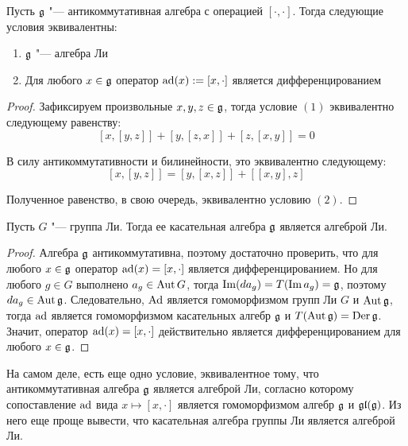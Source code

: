 \begin{theorem}
	Пусть $\mathfrak g$ "--- антикоммутативная алгебра с операцией $[\cdot, \cdot]$. Тогда следующие условия эквивалентны:
	\begin{enumerate}
		\item $\mathfrak g$ "--- алгебра Ли
		\item Для любого $x \in \mathfrak g$ оператор $\operatorname{ad} (x) := [x, \cdot]$ является дифференцированием
	\end{enumerate}
\end{theorem}

\begin{proof}
	Зафиксируем произвольные $x, y, z \in \mathfrak g$, тогда условие $(1)$ эквивалентно следующему равенству:
	\[[x, [y, z]] + [y, [z, x]] + [z, [x, y]] = 0\]
	
	В силу антикоммутативности и билинейности, это эквивалентно следующему:
	\[[x, [y, z]] = [y, [x, z]] + [[x, y], z]\]
	
	Полученное равенство, в свою очередь, эквивалентно условию $(2)$.
\end{proof}

\begin{corollary}
	Пусть $G$ "--- группа Ли. Тогда ее касательная алгебра $\mathfrak g$ является алгеброй Ли.
\end{corollary}

\begin{proof}
	Алгебра $\mathfrak g$ антикоммутативна, поэтому достаточно проверить, что для любого $x \in \mathfrak g$ оператор $\operatorname{ad} (x) = [x, \cdot]$ является дифференцированием. Но для любого $g \in G$ выполнено $a_g \in \operatorname{Aut} G$, тогда $\operatorname{Im} (da_g) = T(\operatorname{Im} a_g) = \mathfrak g$, поэтому $da_g \in \operatorname{Aut}\mathfrak g$. Следовательно, $\operatorname{Ad}$ является гомоморфизмом групп Ли $G$ и $\operatorname{Aut}{\mathfrak g}$, тогда $\operatorname{ad}$ является гомоморфизмом касательных алгебр $\mathfrak g$ и $T(\operatorname{Aut}{\mathfrak g}) = \operatorname{Der}{\mathfrak g}$. Значит, оператор $\operatorname{ad} (x) = [x, \cdot]$ действительно является дифференцированием для любого $x \in \mathfrak g$.
\end{proof}

\begin{note}
	На самом деле, есть еще одно условие, эквивалентное тому, что антикоммутативная алгебра $\mathfrak g$ является алгеброй Ли, согласно которому сопоставление $\operatorname{ad}$ вида $x \mapsto [x, \cdot]$ является гомоморфизмом алгебр $\mathfrak g$ и $\mathfrak{gl}(\mathfrak g)$. Из него еще проще вывести, что касательная алгебра группы Ли является алгеброй Ли.
\end{note}
